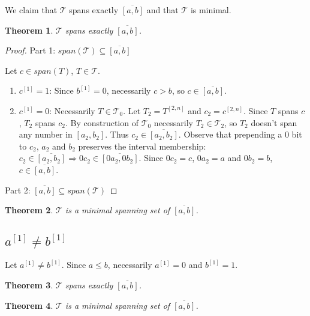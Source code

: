 \documentclass{article}
\theoremstyle{plain}
\newtheorem{theorem}{Theorem}[subsection]
\theoremstyle{definition}
\newcommand{\interval}[2]{[#1, #2]}
\newcommand{\finterval}[2]{\overline{\interval{#1}{#2}}}
\newcommand{\bit}[2]{#1^{[#2]}}
\newcommand{\bits}[3]{#1^{\interval{#2}{#3}}}
\begin{document}
We claim that $\mathcal{T}$ spans exactly $\finterval{a}{b}$
and that $\mathcal{T}$ is minimal.

\begin{theorem}
$\mathcal{T}$ spans exactly $\finterval{a}{b}$.
\end{theorem}

\begin{proof}
Part 1: $span(\mathcal{T}) \subseteq \finterval{a}{b}$

Let $c \in span(T)$, $T \in \mathcal{T}$.

\begin{enumerate}
\item $\bit{c}{1} = 1$: Since $\bit{b}{1} = 0$, necessarily $c > b$, so $c \in \finterval{a}{b}$.
\item $\bit{c}{1} = 0$: Necessarily $T \in \mathcal{T}_0$.
Let $T_2 = \bits{T}{2}{n}$ and $c_2 = \bits{c}{2}{n}$.
Since $T$ spans $c$, $T_2$ spans $c_2$.
By construction of $\mathcal{T}_0$ necessarily $T_2 \in \mathcal{T}_2$,
so $T_2$ doesn't span any number in $\interval{a_2}{b_2}$.
Thus $c_2 \in \finterval{a_2}{b_2}$.
Observe that prepending a $0$ bit to $c_2$, $a_2$ and $b_2$ preserves the interval membership:
$c_2 \in \finterval{a_2}{b_2} \Rightarrow 0 c_2 \in \finterval{0 a_2}{0 b_2}$.
Since $0 c_2 = c$, $0 a_2 = a$ and $0 b_2 = b$,
$c \in \finterval{a}{b}$.
\end{enumerate}

Part 2: $\finterval{a}{b} \subseteq span(\mathcal{T})$
\end{proof}

\begin{theorem}
$\mathcal{T}$ is a minimal spanning set of $\finterval{a}{b}$.
\end{theorem}


\subsection{$\bit{a}{1} \neq \bit{b}{1}$}
Let $\bit{a}{1} \neq \bit{b}{1}$.
Since $a \leq b$, necessarily $\bit{a}{1} = 0$ and $\bit{b}{1} = 1$.


\begin{theorem}
$\mathcal{T}$ spans exactly $\finterval{a}{b}$.
\end{theorem}

\begin{theorem}
$\mathcal{T}$ is a minimal spanning set of $\finterval{a}{b}$.
\end{theorem}




\printglossaries
\end{document}
